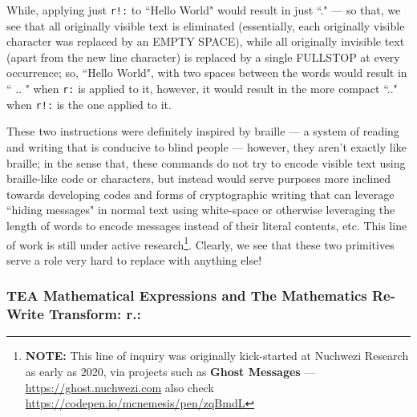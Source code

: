 \documentclass[a4paper, 18pt]{book} %
\begin{document}
{{{While, applying just \texttt{r!:} to ``Hello World" would result in just ``." --- so that, we see that all originally visible text is eliminated (essentially, each originally visible character was replaced by an EMPTY SPACE), while all originally invisible text (apart from the new line character) is replaced by a single FULLSTOP at every occurrence; so, ``Hello  World", with two spaces between the words would result in ``     ..      " when \texttt{r:} is applied to it, however, it would result in the more compact ``.." when \texttt{r!:} is the one applied to it.


\vspace{2em}


These two instructions were definitely inspired by braille --- a system of reading and writing that is conducive to blind people --- however, they aren't exactly like braille; in the sense that, these commands do not try to encode visible text using braille-like code or characters, but instead would serve purposes more inclined towards developing codes and forms of cryptographic writing that can leverage ``hiding messages" in normal text using white-space or otherwise leveraging the length of words to encode messages instead of their literal contents, etc. This line of work is still under active research\footnote{\textbf{NOTE:} This line of inquiry was originally kick-started at Nuchwezi Research as early as 2020, via projects such as \textbf{Ghost Messages} --- \url{https://ghost.nuchwezi.com} also check \url{https://codepen.io/mcnemesis/pen/zqBmdL}}. Clearly, we see that these two primitives serve a role very hard to replace with anything else!


\subsubsection{TEA Mathematical Expressions and The Mathematics Re-Write Transform: r.:}
\label{SECTME}

}}}
\end{document}
